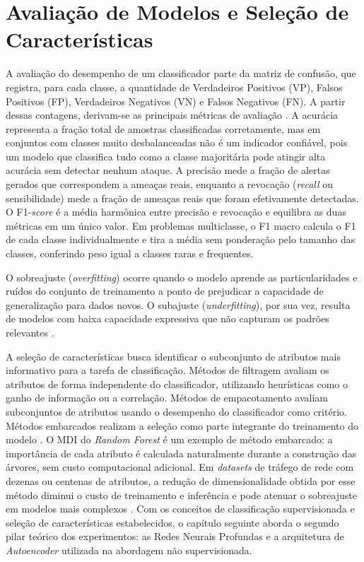 \section{Avaliação de Modelos e Seleção de Características}

A avaliação do desempenho de um classificador parte da matriz de confusão, que registra, para cada classe, a quantidade de Verdadeiros Positivos (VP), Falsos Positivos (FP), Verdadeiros Negativos (VN) e Falsos Negativos (FN). A partir dessas contagens, derivam-se as principais métricas de avaliação \cite{sbrc_minicursos}. A acurácia representa a fração total de amostras classificadas corretamente, mas em conjuntos com classes muito desbalanceadas não é um indicador confiável, pois um modelo que classifica tudo como a classe majoritária pode atingir alta acurácia sem detectar nenhum ataque. A precisão mede a fração de alertas gerados que correspondem a ameaças reais, enquanto a revocação (\textit{recall} ou sensibilidade) mede a fração de ameaças reais que foram efetivamente detectadas. O F1-\textit{score} é a média harmônica entre precisão e revocação e equilibra as duas métricas em um único valor. Em problemas multiclasse, o F1 macro calcula o F1 de cada classe individualmente e tira a média sem ponderação pelo tamanho das classes, conferindo peso igual a classes raras e frequentes.

O sobreajuste (\textit{overfitting}) ocorre quando o modelo aprende as particularidades e ruídos do conjunto de treinamento a ponto de prejudicar a capacidade de generalização para dados novos. O subajuste (\textit{underfitting}), por sua vez, resulta de modelos com baixa capacidade expressiva que não capturam os padrões relevantes \cite{sbrc_minicursos}.

A seleção de características busca identificar o subconjunto de atributos mais informativo para a tarefa de classificação. Métodos de filtragem avaliam os atributos de forma independente do classificador, utilizando heurísticas como o ganho de informação ou a correlação. Métodos de empacotamento avaliam subconjuntos de atributos usando o desempenho do classificador como critério. Métodos embarcados realizam a seleção como parte integrante do treinamento do modelo \cite{sbrc_minicursos}. O MDI do \textit{Random Forest} é um exemplo de método embarcado: a importância de cada atributo é calculada naturalmente durante a construção das árvores, sem custo computacional adicional. Em \textit{datasets} de tráfego de rede com dezenas ou centenas de atributos, a redução de dimensionalidade obtida por esse método diminui o custo de treinamento e inferência e pode atenuar o sobreajuste em modelos mais complexos \cite{medeiros2019sbrc}. Com os conceitos de classificação supervisionada e seleção de características estabelecidos, o capítulo seguinte aborda o segundo pilar teórico dos experimentos: as Redes Neurais Profundas e a arquitetura de \textit{Autoencoder} utilizada na abordagem não supervisionada.
